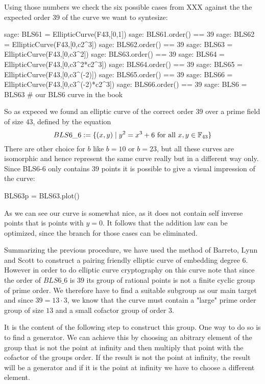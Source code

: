 Using those numbers we check the six possible cases from XXX against the the expected order $39$ of the curve we want to syntesize:

\begin{sagecommandline}
sage: BLS61 = EllipticCurve(F43,[0,1])
sage: BLS61.order() == 39
sage: BLS62 = EllipticCurve(F43,[0,c2^3])
sage: BLS62.order() == 39
sage: BLS63 = EllipticCurve(F43,[0,c3^2])
sage: BLS63.order() == 39
sage: BLS64 = EllipticCurve(F43,[0,c3^2*c2^3])
sage: BLS64.order() == 39
sage: BLS65 = EllipticCurve(F43,[0,c3^(-2)])
sage: BLS65.order() == 39
sage: BLS66 = EllipticCurve(F43,[0,c3^(-2)*c2^3])
sage: BLS66.order() == 39
sage: BLS6 = BLS63 # our BLS6 curve in the book
\end{sagecommandline}
So as expeced we found an elliptic curve of the correct order $39$ over a prime field of size $43$, defined by the equation
\begin{equation}
BLS6\_6 := \{(x,y)\;|\; y^2 = x^3 + 6 \text{ for all } x,y \in \mathbb{F}_{43}\}
\end{equation}
There are other choice for $b$ like $b=10$ or $b=23$, but all these curves are isomorphic and hence represent the same curve really but in a different way only. Since BLS6-6 only contains $39$ points it is possible to give a visual impression of the curve:
\begin{sagesilent}
BLS63p = BLS63.plot()
\end{sagesilent}
\begin{center} 
\end{center}
As we can see our curve is somewhat nice, as it does not contain self inverse points that is points with $y=0$. It follows that the addition law can be optimized, since the branch for those cases can be eliminated. 

Summarizing the previous procedure, we have used the method of Barreto, Lynn and Scott to construct a pairing friendly elliptic curve of embedding degree $6$. However in order to do elliptic curve cryptography on this curve note that since the order of $BLS6\_6$ is $39$ its group of rational points is not a finite cyclic group of prime order. We therefore have to find a suitable subgroup as our main target and since $39=13\cdot 3$, we know that the curve must contain a "large" prime order group of size $13$ and a small cofactor group of order $3$. 

It is the content of the following step to construct this group. One way to do so is to find a generator. We can achieve this by choosing an abitrary element of the group that is not the point at infinity and then multiply that point with the cofactor of the groups order. If the result is not the point at infinity, the result will be a generator and if it is the point at infinity we have to choose a different element. 

